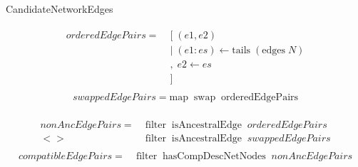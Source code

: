 \documentclass[11pt]{article}
\begin{document}
\begin{algorithm}
		\caption{CandidateNetworkEdges}
		\label{alg:CandidateNetworkEdges}
		\SetAlgoLined
        \begin{align*}
        \begin{split}
         orderedEdgePairs =\; & [\; (e1, e2)\\
                               & |\; (e1 : es) \leftarrow \mathrm{tails}\; (\mathrm{edges}\; N)\\
                               & ,\; e2 \leftarrow es\\
                               & ]
        \end{split}
        \end{align*}
        \begin{align*}
        \begin{split}
        swappedEdgePairs = \mathrm{map\;\;swap\;\;orderedEdgePairs}
        \end{split}
        \end{align*}

        \begin{align*}
        \begin{split}
        nonAncEdgePairs =\;& \mathrm{filter\;\;isAncestralEdge\;\;}orderedEdgePairs\\
                         <>\;\; & \mathrm{filter\;\;isAncestralEdge\;\;}swappedEdgePairs
        \end{split}
        \end{align*}
        \begin{align*}
        \begin{split}
        compatibleEdgePairs =\;& \mathrm{filter\;\;hasCompDescNetNodes\;\;}nonAncEdgePairs
        \end{split}
        \end{align*}


	\end{algorithm}
\newpage
\singlespacing

%


%
\end{document}
